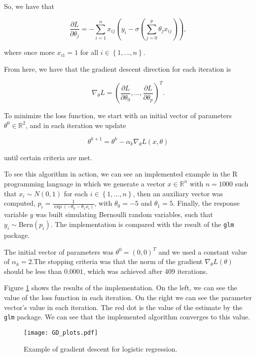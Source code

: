 So, we have that

$$
  \frac{\partial L}{\partial \theta_j} = - \sum_{i = 1}^n { x_{ij}(y_i - \sigma(\sum_{j=0}^{p}{\theta_j x_{ij}})) },
$$

where once more $x_{i1} = 1$ for all $i \in \left\{1, ..., n \right\}$.


From here, we have that the gradient descent direction for each iteration is

$$
  \nabla_{\theta} L = \left( \frac{\partial L}{\partial \theta_0}, ..., \frac{\partial L}{\partial \theta_p} \right)^T.
$$

To minimize the loss function, we start with an initial vector of parameters $\theta^0 \in \mathbb{R}^2$, and in each iteration we update

$$
  \theta^{k+1} = \theta^k - \alpha_k \nabla_{\theta} L(x, \theta)
$$

until certain criteria are met.

To see this algorithm in action, we can see an implemented example in the R programming language in which we generate a vector $x \in \mathbb{R}^n$ with $n = 1000$ such that $x_i \sim N(0, 1)$ for each $i \in \left\{1, ..., n \right\}$, then an auxiliary vector was computed, $p_i = \frac{1}{\exp \left( - \theta_0 - \theta_1 x_i \right)}$, with $\theta_0 = -5$ and $\theta_1 = 5$. Finally, the response variable $y$ was built simulating Bernoulli random variables, such that $y_i \sim \mathrm{Bern}(p_i)$.
The implementation is compared with the result of the \texttt{glm} package.

The initial vector of parameters was $\theta^0 = (0, 0)^T$ and we used a constant value of $\alpha_k = 2$.The stopping criteria was that the norm of the gradient $\nabla_{\theta} L(\theta)$ should be less than $0.0001$, which was achieved after 409 iterations.

Figure \ref{fig:GD_plots} shows the results of the implementation. On the left, we can see the value of the loss function in each iteration. On the right we can see the parameter vector's value in each iteration. The red dot is the value of the estimate by the \texttt{glm} package. We can see that the implemented algorithm converges to this value.

\begin{figure}[H]
    \centering
    \texttt{[image: GD\_plots.pdf]}
    \caption{Example of gradient descent for logistic regression.}
    \label{fig:GD_plots}
\end{figure}


